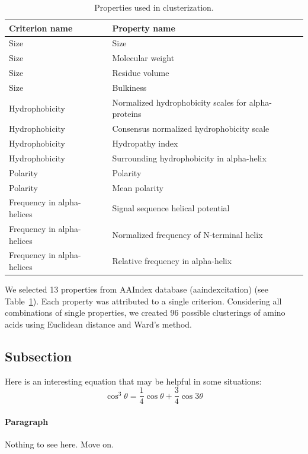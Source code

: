 \documentclass[fleqn,10pt,twoside]{gcb15submission}
\begin{document}
\begin{table}[ht]
\centering
\begin{tabular}{ll}
  \toprule
Criterion name & Property name \\ 
  \midrule
Size & Size \\ 
   \rowcolor[gray]{0.85}Size & Molecular weight \\ 
  Size & Residue volume \\ 
   \rowcolor[gray]{0.85}Size & Bulkiness \\ 
  Hydrophobicity & Normalized hydrophobicity scales for alpha-proteins \\ 
   \rowcolor[gray]{0.85}Hydrophobicity & Consensus normalized hydrophobicity scale \\ 
  Hydrophobicity & Hydropathy index \\ 
   \rowcolor[gray]{0.85}Hydrophobicity & Surrounding hydrophobicity in alpha-helix \\ 
  Polarity & Polarity \\ 
   \rowcolor[gray]{0.85}Polarity & Mean polarity \\ 
  Frequency in alpha-helices & Signal sequence helical potential \\ 
   \rowcolor[gray]{0.85}Frequency in alpha-helices & Normalized frequency of N-terminal helix \\ 
  Frequency in alpha-helices & Relative frequency in alpha-helix \\ 
   \bottomrule
\end{tabular}
\caption{Properties used in clusterization.} 
\label{tab:aaprop}
\end{table}

We selected 13 properties from AAIndex database (aaindexcitation) (see Table~\ref{tab:aaprop}). Each property was attributed to a single criterion. Considering all combinations of single properties, we created 96 possible clusterings of amino acids using Euclidean distance and Ward's method. 


\subsection*{Subsection}

Here is an interesting equation that may be helpful in some situations:
\begin{equation}
\cos^3 \theta =\frac{1}{4}\cos\theta+\frac{3}{4}\cos 3\theta
\label{eq:refname2}
\end{equation}

\paragraph{Paragraph}
Nothing to see here. Move on.
\end{document}
